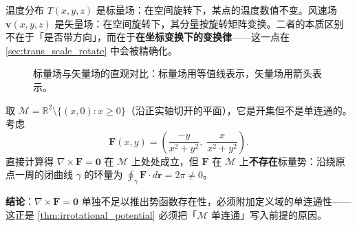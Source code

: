 \begin{example}[两个基本标量场与矢量场]
温度分布 $T(x,y,z)$ 是标量场：在空间旋转下，某点的温度数值不变。风速场 $\mathbf{v}(x,y,z)$ 是矢量场：在空间旋转下，其分量按旋转矩阵变换。二者的本质区别不在于「是否带方向」，而在于\textbf{在坐标变换下的变换律}——这一点在 \cref{sec:trans_scale_rotate} 中会被精确化。
\end{example}

\begin{figure}[htbp]
\centering
{}
\caption{标量场与矢量场的直观对比：标量场用等值线表示，矢量场用箭头表示。}
\label{fig:scalar_vector_field}
\end{figure}

\begin{example}\label{ex:slit_domain_counterexample}
取 $\mathcal{M} = \mathbb{R}^2 \setminus \{(x,0) : x \ge 0\}$（沿正实轴切开的平面），它是开集但不是单连通的。考虑
\[
\mathbf{F}(x,y) = \left( \frac{-y}{x^2+y^2},\; \frac{x}{x^2+y^2} \right).
\]
直接计算得 $\nabla \times \mathbf{F} = \mathbf{0}$ 在 $\mathcal{M}$ 上处处成立，但 $\mathbf{F}$ 在 $\mathcal{M}$ 上\textbf{不存在}标量势：沿绕原点一周的闭曲线 $\gamma$ 的环量为 $\oint_\gamma \mathbf F \cdot d\mathbf r = 2\pi \neq 0$。

\textbf{结论}：$\nabla\times\mathbf F=\mathbf 0$ 单独不足以推出势函数存在性，必须附加定义域的单连通性——这正是 \cref{thm:irrotational_potential} 必须把「$\mathcal{M}$ 单连通」写入前提的原因。
\end{example}

